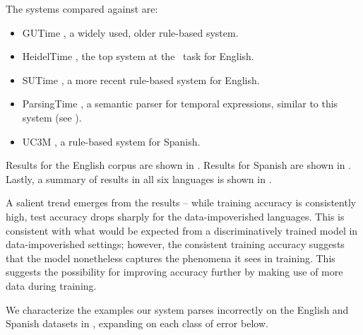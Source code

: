 The systems compared against are:
\begin{itemize}
\setlength{\itemsep}{0cm}
\item GUTime \cite{key:2000mani-temporal}, a widely used, older rule-based
              system.
\item HeidelTime \cite{key:2010strotgen-temporal}, the top
                 system at the \tempeval\ task for English.
\item SUTime \cite{key:2012chang-temporal}, a more recent rule-based
             system for English.
\item ParsingTime \mec, a semantic parser for temporal expressions, similar to
                  this system (see ).
\item UC3M \cite{2010vicente-uc3m}, a rule-based system for
             Spanish.
\end{itemize}

Results for the English corpus are shown in .
Results for Spanish are shown in .
Lastly, a summary of results in all six languages is shown in
  .

A salient trend emerges from the results -- while training accuracy is
  consistently high, test accuracy drops sharply for the data-impoverished
  languages.
This is consistent with what would be expected from a discriminatively trained
  model in data-impoverished settings; however, the consistent training accuracy
  suggests that the model nonetheless captures the phenomena it sees
  in training.
This suggests the possibility for improving accuracy further by making use of
  more data during training.


We characterize the examples our system parses incorrectly
  on the English and Spanish datasets in
  , expanding on each class of error below.


